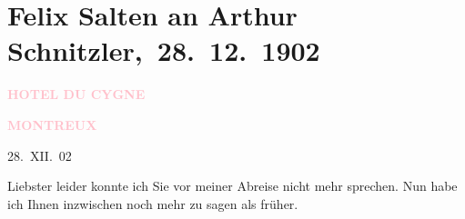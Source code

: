 

\renewcommand{\erwaehntePersonen}{Personen: Wilhelmine Adamović, Samuel Fischer, André Giron, Hugo von Hofmannsthal,  Luise von Sachsen,  Luise von Sachsen, Leopold Ferdinand Salvator Wölfling}
\renewcommand{\erwaehnteOrte}{Orte: Bern, Europa, Genf, Hotel du Cygne Montreux, Montreux, Schweiz, Wien}
\renewcommand{\erwaehnteWerke}{Werke: Das gerettete Venedig. Trauerspiel in fünf Aufzügen, Erinnerungen, Tagebuch}
\section[ Felix Salten an Arthur Schnitzler, 28. 12. 1902]{Felix Salten an Arthur Schnitzler, 28. 12. 1902}
\nopagebreak{}
\rehead{ }\normalsize\beginnumbering{}
\toendnotes[C]{\smallbreak\pagebreak[2]}
\toendnotes[C]{\smallbreak}
\pstart
           \noindent{}\raggedleft{}{\pb}\textcolor{gray}{\textbf{\textcolor{pink}{HOTEL DU CYGNE}{}\ledrightnote{\textcolor{pink}{Hotel du Cygne Montreux}}}}\pend
           
\pstart
           \noindent{}\raggedleft{}\textcolor{gray}{\textbf{\textcolor{pink}{MONTREUX}{}\ledrightnote{\textcolor{pink}{Montreux}}}}\pend
           
\pstart
           \raggedleft{}28. XII. 02\pend
           
\pstart
           Liebster leider konnte ich Sie vor meiner Abreise nicht mehr
               sprechen. Nun habe ich Ihnen inzwischen noch mehr zu sagen als früher.\pend
           
